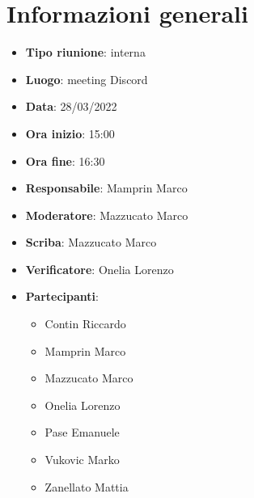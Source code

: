 \section{Informazioni generali}
\begin{itemize}
  \item \textbf{Tipo riunione}: interna
  \item \textbf{Luogo}: meeting Discord
  \item \textbf{Data}: 28/03/2022
  \item \textbf{Ora inizio}: 15:00
  \item \textbf{Ora fine}: 16:30
  \item \textbf{Responsabile}: Mamprin Marco
  \item \textbf{Moderatore}: Mazzucato Marco
  \item \textbf{Scriba}: Mazzucato Marco
  \item \textbf{Verificatore}: Onelia Lorenzo
  \item \textbf{Partecipanti}:
  \begin{itemize}
    \item Contin Riccardo
    \item Mamprin Marco
    \item Mazzucato Marco
    \item Onelia Lorenzo
    \item Pase Emanuele
    \item Vukovic Marko
    \item Zanellato Mattia
  \end{itemize}
\end{itemize}
